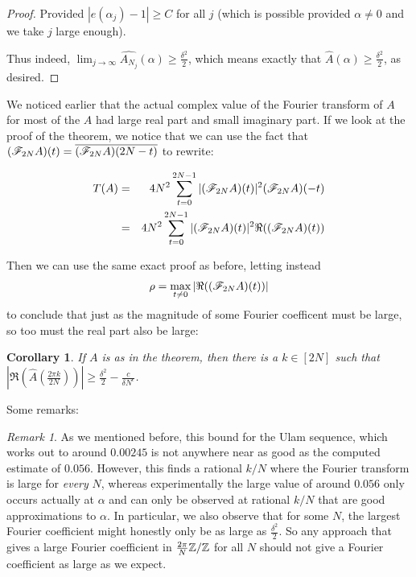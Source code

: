 \documentclass{report}
\newtheorem{corollary}{Corollary}[theorem]
\theoremstyle{remark}
\newtheorem{remark}{Remark}
\numberwithin{equation}{section}
\begin{document}
\begin{proof}
  Provided $|e(\alpha_j) - 1| \geq C$ for all $j$ (which is possible
  provided $\alpha \neq 0$ and we take $j$ large enough).

  Thus indeed,
  $\lim_{j \to \infty} \widehat{A_{N_j}}(\alpha) \geq
  \frac{\delta^2}{2}$, which means exactly that
  $\widehat{A}(\alpha) \geq \frac{\delta^2}{2}$, as desired.
\end{proof}

We noticed earlier that the actual complex value of the Fourier
transform of $A$ for most of the $A$ had large real part and small
imaginary part.  If we look at the proof of the theorem, we notice
that we can use the fact that
$(\mathscr{F}_{2N}A)(t) = \overline{(\mathscr{F}_{2N}A)(2N-t)}$ to rewrite:

\begin{eqnarray*}
T(A) &=& 4 N^2 \sum_{t=0}^{2N-1} |(\mathscr{F}_{2N}A)(t)|^2(\mathscr{F}_{2N}A)(-t)\\
 &=& 4 N^2 \sum_{t=0}^{2N-1} |(\mathscr{F}_{2N}A)(t)|^2\Re((\mathscr{F}_{2N}A)(t))
\end{eqnarray*}

Then we can use the same exact proof as before, letting instead
\[\rho = \max_{t \neq 0} |\Re((\mathscr{F}_{2N}A)(t))|\] to conclude that
just as the magnitude of some Fourier coefficent must be large, so too
must the real part also be large:

\begin{corollary}\label{thm:alpha_real}
  If $A$ is as in the theorem, then there is a $k \in [2N]$ such that
  $|\Re(\widehat{A}(\frac{2\pi k}{2N}))| \geq \frac{\delta^2}{2} -
  \frac{c}{\delta N^\epsilon}$.
\end{corollary}

Some remarks: 

\begin{remark}
  As we mentioned before, this bound for the Ulam sequence, which
  works out to around $0.00245$ is not anywhere near as good as the
  computed estimate of $0.056$.  However, this finds a rational $k/N$
  where the Fourier transform is large for \textit{every} $N$, whereas
  experimentally the large value of around $0.056$ only occurs
  actually at $\alpha$ and can only be observed at rational $k/N$ that
  are good approximations to $\alpha$.  In particular, we also observe
  that for some $N$, the largest Fourier coefficient might honestly
  only be as large as $\frac{\delta^2}{2}$.  So any approach that
  gives a large Fourier coefficient in $\frac{2\pi}{N}\mathbb{Z}/\mathbb{Z}$ for all
  $N$ should not give a Fourier coefficient as large as we expect.
\end{remark}
\end{document}
